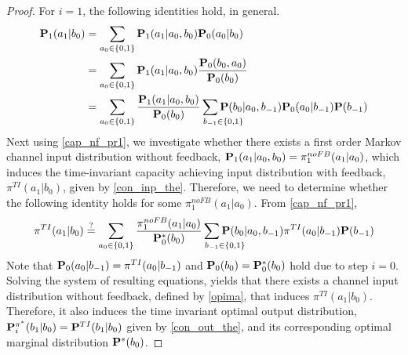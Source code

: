 \documentclass[11pt, a4paper, journal,onecolumn]{IEEEtran}
\newcommand{\sr}{\stackrel}
\begin{document}
\begin{proof}
For $i=1$, the following identities hold, in general. 
\begin{align}
{\bf P}_1(a_1|b_{0})
&=\sum_{ a_{0} \in \{0,1\} } {\bf P}_1(a_1|a_{0}, b_{0}) {\bf P}_0(a_{0}|b_{0})\nonumber\\
&=\sum_{a_{0} \in \{0,1\} }{\bf P}_1(a_1|a_{0}, b_{0})\frac{{\bf P}_0(b_{0},a_{0})}{{\bf P}_0(b_{0})}\nonumber\\
&=\sum_{a_{0} \in \{0,1\} }\frac{{\bf P}_1(a_1|a_{0}, b_{0})}{{\bf P}_0(b_{0})}\sum_{b_{-1} \mathrlap{\in \{0,1\} }}{{\bf P}(b_{0}|a_{0}, b_{-1})
 {{\bf P}_0(a_{0}|b_{-1})}{\bf P}(b_{-1}) }\label{cap_nf_pr1}
\end{align}
Next using \eqref{cap_nf_pr1}, we investigate whether there exists a first order Markov channel input distribution without feedback, ${\bf P}_1(a_1|a_{0},b_{0})={\pi}^{noFB}_1(a_1|a_{0})$, which induces the  time-invariant capacity achieving input distribution with feedback, ${\pi}^{TI}(a_1|b_{0})$, given by \eqref{con_inp_the}. Therefore, we need to determine whether the following identity holds for some ${\pi}^{noFB}_1(a_1|a_{0})$. From \eqref{cap_nf_pr1},
\begin{align}
{\pi}^{TI}(a_1|b_{0})\sr{?}{=}\sum_{a_{0} \in \{0,1\} }\frac{{\pi}_1^{noFB}(a_1|a_{0})}{{\bf P}^*_0(b_{0})}\sum_{b_{-1} \mathrlap{\in \{0,1\} }}{{\bf P}(b_{0}|a_{0}, b_{-1})
 {{\pi^{TI}}(a_{0}|b_{-1})}{\bf P}(b_{-1}) }\label{cap_nf_pr2}
\end{align}
 Note that ${\bf P}_0(a_{0}|b_{-1})={\pi^{TI}}(a_{0}|b_{-1})$ and ${\bf P}_0(b_{0})={\bf P}^*_0(b_{0})$ hold due to step $i=0$. Solving the system of resulting equations, yields that there exists a channel input distribution without feedback, defined by \eqref{opima}, that induces ${\pi}^{TI}(a_1|b_{0})$. Therefore, it also induces the time invariant optimal output distribution, ${\bf P}_i^{{\pi}^*}(b_1|b_{0})={\bf P}^{TI}(b_1|b_{0})$ given by \eqref{con_out_the}, and its corresponding optimal marginal distribution ${\bf P}^*(b_0)$.
 

\end{proof}
\end{document}
